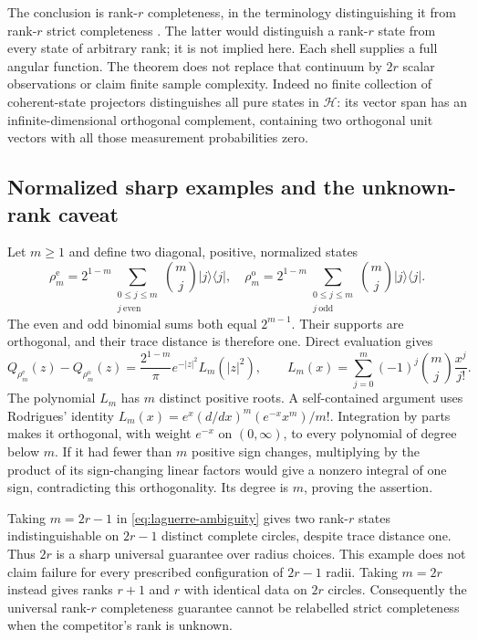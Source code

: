 The conclusion is rank-$r$ completeness, in the terminology distinguishing it
from rank-$r$ strict completeness \cite{BDK2016}. The latter would distinguish
a rank-$r$ state from every state of arbitrary rank; it is not implied here.
Each shell supplies a full angular function. The theorem does not replace
that continuum by $2r$ scalar observations or claim finite sample complexity.
Indeed no finite collection of coherent-state projectors distinguishes all
pure states in $\mathcal H$: its vector span has an infinite-dimensional
orthogonal complement, containing two orthogonal unit vectors with all those
measurement probabilities zero.

\subsection{Normalized sharp examples and the unknown-rank caveat}
Let $m\ge1$ and define two diagonal, positive, normalized states
\[
 \rho_m^{\mathrm e}=2^{1-m}\sum_{\substack{0\le j\le m\\ j\ {\mathrm{even}}}}
           \binom mj |j\rangle\langle j|,
 \quad
 \rho_m^{\mathrm o}=2^{1-m}\sum_{\substack{0\le j\le m\\ j\ {\mathrm{odd}}}}
           \binom mj |j\rangle\langle j|.
\]
The even and odd binomial sums both equal $2^{m-1}$. Their supports are
orthogonal, and their trace distance is therefore one. Direct evaluation gives
\[
 Q_{\rho_m^{\mathrm e}}(z)-Q_{\rho_m^{\mathrm o}}(z)
     =\frac{2^{1-m}}{\pi}e^{-|z|^2}L_m(|z|^2),
 \qquad L_m(x)=\sum_{j=0}^m(-1)^j\binom mj\frac{x^j}{j!}.
 \tag{H.2}\label{eq:laguerre-ambiguity}
\]
The polynomial $L_m$ has $m$ distinct positive roots. A self-contained argument
uses Rodrigues' identity
$L_m(x)=e^x(d/dx)^m(e^{-x}x^m)/m!$. Integration by parts makes it orthogonal,
with weight $e^{-x}$ on $(0,\infty)$, to every polynomial of degree below $m$.
If it had fewer than $m$ positive sign changes, multiplying by the product of
its sign-changing linear factors would give a nonzero integral of one sign,
contradicting this orthogonality. Its degree is $m$, proving the assertion.

Taking $m=2r-1$ in \eqref{eq:laguerre-ambiguity} gives two rank-$r$ states
indistinguishable on $2r-1$ distinct complete circles, despite trace distance
one. Thus $2r$ is a sharp universal guarantee over radius choices. This
example does not claim failure for every prescribed configuration of $2r-1$
radii. Taking $m=2r$ instead gives ranks $r+1$ and $r$ with identical data on
$2r$ circles. Consequently the universal rank-$r$ completeness guarantee
cannot be relabelled strict completeness when the competitor's rank is unknown.

